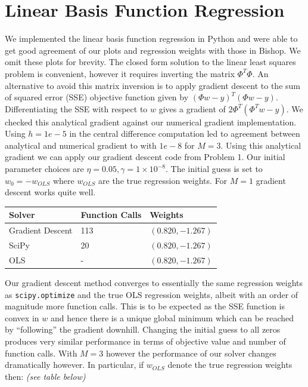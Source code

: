 \documentclass[10pt]{article}
\begin{document}
\section{Linear Basis Function Regression}
We implemented the linear basis function regression in Python and were able to get good agreement of our plots and regression weights with those in Bishop. We omit these plots for brevity. The closed form solution to the linear least squares problem is convenient, however it requires inverting the matrix $\Phi^T \Phi$. An alternative to avoid this matrix inversion is to apply gradient descent to the sum of squared error (SSE) objective function given by $(\Phi w - y)^T(\Phi w - y)$. Differentiating the SSE with respect to $w$ gives a gradient of $2\Phi^T(\Phi^T w - y)$. We checked this analytical gradient against our numerical gradient implementation. Using $h = 1e-5$ in the central difference computation led to agreement between analytical and numerical gradient to with $1e-8$ for $M = 3$. Using this analytical gradient we can apply our gradient descent code from Problem 1. 
Our initial parameter choices are $\eta = 0.05, \gamma = 1 \times 10^{-8}$. The initial guess is set to $w_0 = -w_{OLS}$ where $w_{OLS}$ are the true regression weights. For $M = 1$ gradient descent works quite well.

\begin{tabular}{|l|l|l|}
\hline
Solver & Function Calls & Weights \\ \hline
Gradient Descent & 113 & $(0.820, -1.267)$ \\ \hline
SciPy & 20 & $(0.820, -1.267)$ \\ \hline
OLS  & - & $(0.820, -1.267)$ \\ \hline
\end{tabular}
%

Our gradient descent method converges to essentially the same regression weights as \nolinkurl{scipy.optimize} and the true OLS regression weights, albeit with an order of magnitude more function calls. This is to be expected as the SSE function is convex in $w$ and hence there is a unique global minimum which can be reached by ``following'' the gradient downhill. Changing the initial guess to all zeros produces very similar performance in terms of objective value and number of function calls. With $M=3$ however the performance of our solver changes dramatically however. In particular, if $w_{OLS}$ denote the true regression weights then: \textit{(see table below)}
\end{document}
